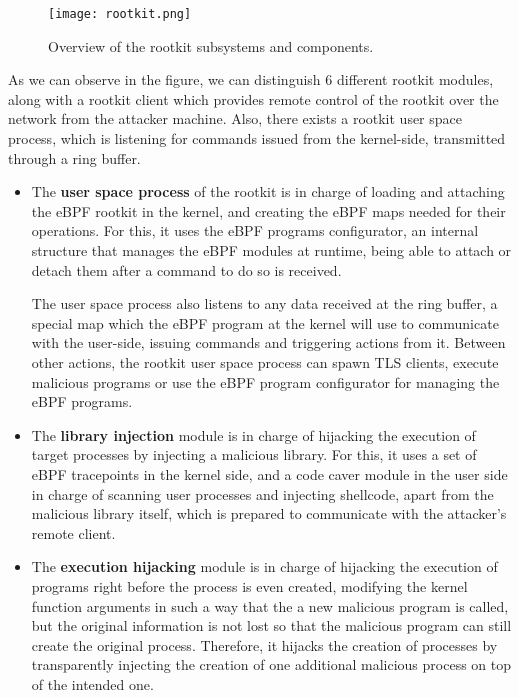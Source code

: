 \begin{figure}[htbp]
	\centering
	\texttt{[image: rootkit.png]}
	\caption{Overview of the rootkit subsystems and components.}
	\label{fig:rootkit}
\end{figure}

As we can observe in the figure, we can distinguish 6 different rootkit modules, along with a rootkit client which provides remote control of the rootkit over the network from the attacker machine. Also, there exists a rootkit user space process, which is listening for commands issued from the kernel-side, transmitted through a ring buffer.
\begin{itemize}
\item The \textbf{user space process} of the rootkit is in charge of loading and attaching the eBPF rootkit in the kernel, and creating the eBPF maps needed for their operations. For this, it uses the eBPF programs configurator, an internal structure that manages the eBPF modules at runtime, being able to attach or detach them after a command to do so is received.

The user space process also listens to any data received at the ring buffer, a special map which the eBPF program at the kernel will use to communicate with the user-side, issuing commands and triggering actions from it. Between other actions, the rootkit user space process can spawn TLS clients, execute malicious programs or use the eBPF program configurator for managing the eBPF programs.

\item The \textbf{library injection} module is in charge of hijacking the execution of target processes by injecting a malicious library. For this, it uses a set of eBPF tracepoints in the kernel side, and a code caver module in the user side in charge of scanning user processes and injecting shellcode, apart from the malicious library itself, which is prepared to communicate with the attacker's remote client.

\item The \textbf{execution hijacking} module is in charge of hijacking the execution of programs right before the process is even created, modifying the kernel function arguments in such a way that the a new malicious program is called, but the original information is not lost so that the malicious program can still create the original process. Therefore, it hijacks the creation of processes by transparently injecting the creation of one additional malicious process on top of the intended one.


\end{itemize}
